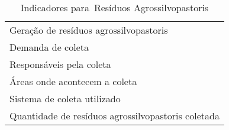 \begin{table}[h!]
  \centering
  \caption{Indicadores para Resíduos Agrossilvopastoris}
    \begin{tabular}{|p{22.57em}|}
    \rowcolor[rgb]{ .984,  .831,  .706} \multicolumn{1}{p{22.57em}}{RESÍDUOS AGROSSILVOPASTORIS} \\
    \midrule
    Geração de resíduos agrossilvopastoris  \\
    \midrule
    Demanda de coleta  \\
    \midrule
    Responsáveis pela coleta \\
    \midrule
    Áreas onde acontecem a coleta \\
    \midrule
    Sistema de coleta utilizado \\
    \midrule
    Quantidade de resíduos agrossilvopastoris coletada \\
    \bottomrule
    \end{tabular}%
  \label{tab:ind_agrossilvo}%
\end{table}%
